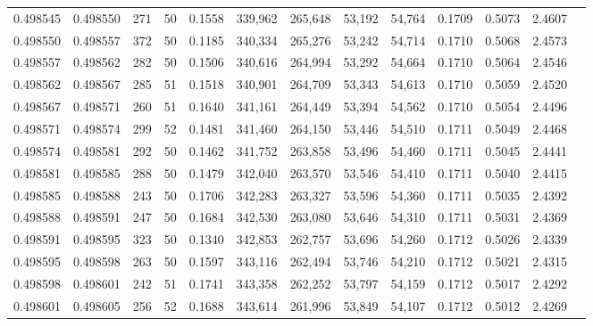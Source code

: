 \begin{tabular}{rrrrrrrrrrrrr}
0.498545 & 0.498550 & 271 &  50 &                                     0.1558 & 339,962 & 265,648 &  53,192 &  54,764 & 0.1709 & 0.5073 & 2.4607 \\
0.498550 & 0.498557 & 372 &  50 &                                     0.1185 & 340,334 & 265,276 &  53,242 &  54,714 & 0.1710 & 0.5068 & 2.4573 \\
0.498557 & 0.498562 & 282 &  50 &                                     0.1506 & 340,616 & 264,994 &  53,292 &  54,664 & 0.1710 & 0.5064 & 2.4546 \\
0.498562 & 0.498567 & 285 &  51 &                                     0.1518 & 340,901 & 264,709 &  53,343 &  54,613 & 0.1710 & 0.5059 & 2.4520 \\
0.498567 & 0.498571 & 260 &  51 &                                     0.1640 & 341,161 & 264,449 &  53,394 &  54,562 & 0.1710 & 0.5054 & 2.4496 \\
0.498571 & 0.498574 & 299 &  52 &                                     0.1481 & 341,460 & 264,150 &  53,446 &  54,510 & 0.1711 & 0.5049 & 2.4468 \\
0.498574 & 0.498581 & 292 &  50 &                                     0.1462 & 341,752 & 263,858 &  53,496 &  54,460 & 0.1711 & 0.5045 & 2.4441 \\
0.498581 & 0.498585 & 288 &  50 &                                     0.1479 & 342,040 & 263,570 &  53,546 &  54,410 & 0.1711 & 0.5040 & 2.4415 \\
0.498585 & 0.498588 & 243 &  50 &                                     0.1706 & 342,283 & 263,327 &  53,596 &  54,360 & 0.1711 & 0.5035 & 2.4392 \\
0.498588 & 0.498591 & 247 &  50 &                                     0.1684 & 342,530 & 263,080 &  53,646 &  54,310 & 0.1711 & 0.5031 & 2.4369 \\
0.498591 & 0.498595 & 323 &  50 &                                     0.1340 & 342,853 & 262,757 &  53,696 &  54,260 & 0.1712 & 0.5026 & 2.4339 \\
0.498595 & 0.498598 & 263 &  50 &                                     0.1597 & 343,116 & 262,494 &  53,746 &  54,210 & 0.1712 & 0.5021 & 2.4315 \\
0.498598 & 0.498601 & 242 &  51 &                                     0.1741 & 343,358 & 262,252 &  53,797 &  54,159 & 0.1712 & 0.5017 & 2.4292 \\
0.498601 & 0.498605 & 256 &  52 &                                     0.1688 & 343,614 & 261,996 &  53,849 &  54,107 & 0.1712 & 0.5012 & 2.4269 \\

\end{tabular}
